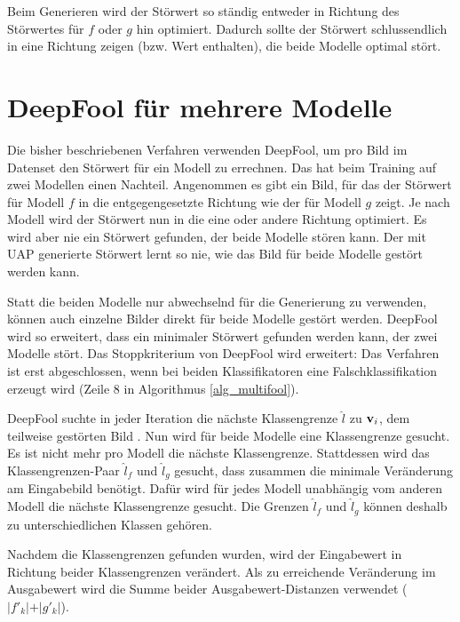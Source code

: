 \documentclass{FFHS_Thesis_Additions/ffhsthesis}
\begin{document}
Beim Generieren wird der Störwert so ständig entweder in Richtung des Störwertes für $f$ oder $g$ hin optimiert. 
Dadurch sollte der Störwert schlussendlich in eine Richtung zeigen (bzw. Wert enthalten), die beide Modelle optimal stört.


\section{DeepFool für mehrere Modelle}
\label{c_multifool}

Die bisher beschriebenen Verfahren verwenden DeepFool, um pro Bild im Datenset den Störwert für ein Modell zu errechnen. 
Das hat beim Training auf zwei Modellen einen Nachteil. 
Angenommen es gibt ein Bild, für das der Störwert für Modell $f$ in die entgegengesetzte Richtung wie der für Modell $g$ zeigt. 
Je nach Modell wird der Störwert nun in die eine oder andere Richtung optimiert. 
Es wird aber nie ein Störwert gefunden, der beide Modelle stören kann. 
Der mit UAP generierte Störwert lernt so nie, wie das Bild für beide Modelle gestört werden kann.

Statt die beiden Modelle nur abwechselnd für die Generierung zu verwenden, können auch einzelne Bilder direkt für beide Modelle gestört werden. 
DeepFool wird so erweitert, dass ein minimaler Störwert gefunden werden kann, der zwei Modelle stört. 
Das Stoppkriterium von DeepFool wird erweitert: Das Verfahren ist erst abgeschlossen, wenn bei beiden Klassifikatoren eine Falschklassifikation erzeugt wird (Zeile $8$ in Algorithmus \ref{alg_multifool}).



DeepFool suchte in jeder Iteration die nächste Klassengrenze $\hat{l}$ zu $\bold{v}_i$, dem teilweise gestörten Bild \cite{moosavi-dezfooli_deepfool_2016}. 
Nun wird für beide Modelle eine Klassengrenze gesucht. 
Es ist nicht mehr pro Modell die nächste Klassengrenze. 
Stattdessen wird das Klassengrenzen-Paar $\hat{l}_f$ und $\hat{l}_g$ gesucht, dass zusammen die minimale Veränderung am Eingabebild benötigt. 
Dafür wird für jedes Modell unabhängig vom anderen Modell die nächste Klassengrenze gesucht. 
Die Grenzen $\hat{l}_f$ und $\hat{l}_g$ können deshalb zu unterschiedlichen Klassen gehören. 

Nachdem die Klassengrenzen gefunden wurden, wird der Eingabewert in Richtung beider Klassengrenzen verändert. 
Als zu erreichende Veränderung im Ausgabewert wird die Summe beider Ausgabewert-Distanzen verwendet ($\vert f'_k \vert + \vert g'_k \vert$). 
\end{document}
